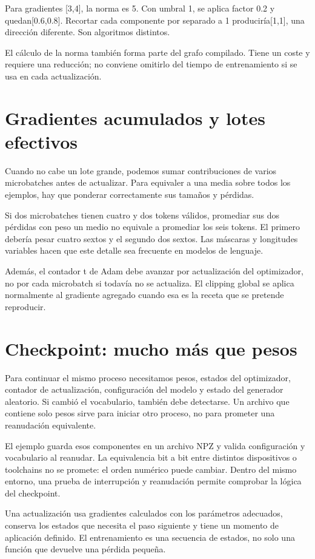 \documentclass[12pt,a4paper,oneside]{report}
\begin{document}
Para gradientes [3,4], la norma es 5. Con umbral 1, se aplica factor 0.2 y quedan[0.6,0.8]. Recortar cada componente por separado a 1 produciría[1,1], una dirección diferente. Son algoritmos distintos.

El cálculo de la norma también forma parte del grafo compilado. Tiene un coste y requiere una reducción; no conviene omitirlo del tiempo de entrenamiento si se usa en cada actualización.

\section{Gradientes acumulados y lotes efectivos}
Cuando no cabe un lote grande, podemos sumar contribuciones de varios microbatches antes de actualizar. Para equivaler a una media sobre todos los ejemplos, hay que ponderar correctamente sus tamaños y pérdidas.

Si dos microbatches tienen cuatro y dos tokens válidos, promediar sus dos pérdidas con peso un medio no equivale a promediar los seis tokens. El primero debería pesar cuatro sextos y el segundo dos sextos. Las máscaras y longitudes variables hacen que este detalle sea frecuente en modelos de lenguaje.

Además, el contador t de Adam debe avanzar por actualización del optimizador, no por cada microbatch si todavía no se actualiza. El clipping global se aplica normalmente al gradiente agregado cuando esa es la receta que se pretende reproducir.

\section{Checkpoint: mucho más que pesos}
Para continuar el mismo proceso necesitamos pesos, estados del optimizador, contador de actualización, configuración del modelo y estado del generador aleatorio. Si cambió el vocabulario, también debe detectarse. Un archivo que contiene solo pesos sirve para iniciar otro proceso, no para prometer una reanudación equivalente.

El ejemplo guarda esos componentes en un archivo NPZ y valida configuración y vocabulario al reanudar. La equivalencia bit a bit entre distintos dispositivos o toolchains no se promete: el orden numérico puede cambiar. Dentro del mismo entorno, una prueba de interrupción y reanudación permite comprobar la lógica del checkpoint.

\begin{comprueba}
Una actualización usa gradientes calculados con los parámetros adecuados, conserva los estados que necesita el paso siguiente y tiene un momento de aplicación definido. El entrenamiento es una secuencia de estados, no solo una función que devuelve una pérdida pequeña.

\end{comprueba}
\end{document}
